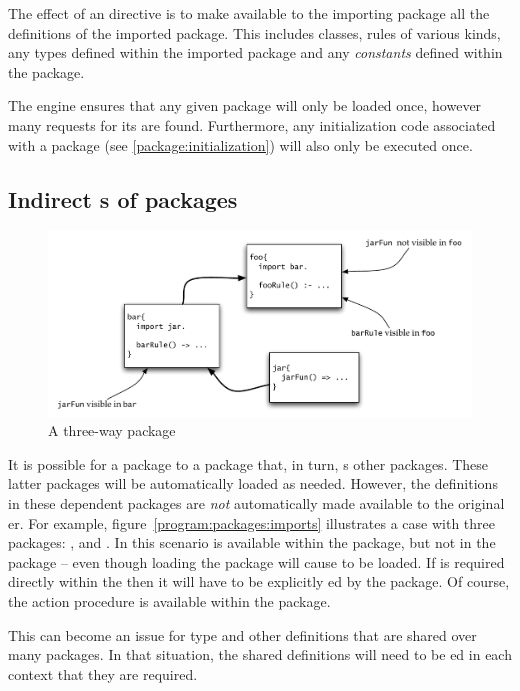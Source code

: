 The effect of an  directive is to make available to the importing package all the definitions of the imported package. This includes classes, rules of various kinds, any types defined within the imported package and any \emph{constants} defined within the package.

The \go engine ensures that any given package will only be loaded once, however many requests for its  are found. Furthermore, any initialization code associated with a package (see \vref{package:initialization}) will also only be executed once.

\subsection{Indirect s of packages}
\begin{figure}
\includegraphics[width=\textwidth]{packages}
\caption{A three-way package }
\label{program:packages:imports}
\end{figure}
It is possible for a package to  a package that, in turn, s other packages. These latter packages will be automatically loaded as needed. However, the definitions in these dependent packages are \emph{not} automatically made available to the original er. For example, figure~\vref{program:packages:imports} illustrates a case with three packages: ,  and .
In this scenario  is available within the  package, but not in the  package -- even though loading the  package will cause  to be loaded. If  is required directly within the  then it will have to be explicitly ed by the  package. Of course, the  action procedure is available within the  package.

This can become an issue for type and other definitions that are shared over many packages. In that situation, the shared definitions will need to be ed in each context that they are required.

